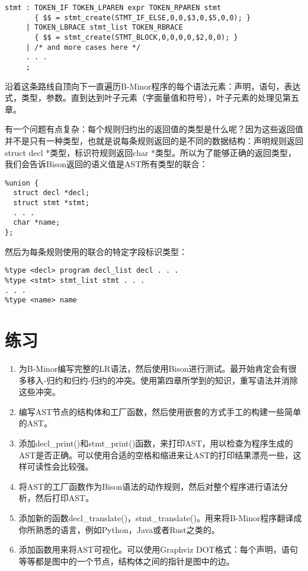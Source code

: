 \documentclass[cn,11pt,chinese]{elegantbook}
\begin{document}
\begin{verbatim}
stmt : TOKEN_IF TOKEN_LPAREN expr TOKEN_RPAREN stmt
       { $$ = stmt_create(STMT_IF_ELSE,0,0,$3,0,$5,0,0); }
     | TOKEN_LBRACE stmt_list TOKEN_RBRACE
       { $$ = stmt_create(STMT_BLOCK,0,0,0,0,$2,0,0); }
     | /* and more cases here */
     . . .
     ;
\end{verbatim}

沿着这条路线自顶向下一直遍历B-Minor程序的每个语法元素：声明，语句，表达式，类型，参数。直到达到叶子元素（字面量值和符号），叶子元素的处理见第五章。

有一个问题有点复杂：每个规则归约出的返回值的类型是什么呢？因为这些返回值并不是只有一种类型，也就是说每条规则返回的是不同的数据结构：声明规则返回struct decl *类型，标识符规则返回char *类型。所以为了能够正确的返回类型，我们会告诉Bison返回的语义值是AST所有类型的联合：

\begin{verbatim}
%union {
  struct decl *decl;
  struct stmt *stmt;
  . . .
  char *name;
};
\end{verbatim}

然后为每条规则使用的联合的特定字段标识类型：

\begin{verbatim}
%type <decl> program decl_list decl . . .
%type <stmt> stmt_list stmt . . .
. . .
%type <name> name
\end{verbatim}

\section{练习}

\begin{enumerate}
  \item 为B-Minor编写完整的LR语法，然后使用Bison进行测试。最开始肯定会有很多移入-归约和归约-归约的冲突。使用第四章所学到的知识，重写语法并消除这些冲突。
  \item 编写AST节点的结构体和工厂函数，然后使用嵌套的方式手工的构建一些简单的AST。
  \item 添加decl\_print()和stmt\_print()函数，来打印AST，用以检查为程序生成的AST是否正确。可以使用合适的空格和缩进来让AST的打印结果漂亮一些，这样可读性会比较强。
  \item 将AST的工厂函数作为Bison语法的动作规则，然后对整个程序进行语法分析，然后打印AST。
  \item 添加新的函数decl\_translate()，stmt\_translate()。用来将B-Minor程序翻译成你所熟悉的语言，例如Python，Java或者Rust之类的。
  \item 添加函数用来将AST可视化。可以使用Graphviz DOT格式：每个声明，语句等等都是图中的一个节点，结构体之间的指针是图中的边。
\end{enumerate}
\end{document}
